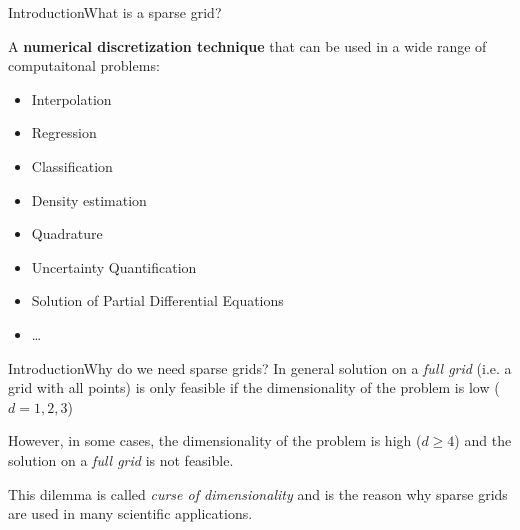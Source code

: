 \begin{frame}{Introduction}{What is a sparse grid?}

    A \textbf{numerical discretization technique} that can be used in a wide range of computaitonal problems:
    \begin{itemize}[<+->]
        \item Interpolation
        \item Regression
        \item Classification
        \item Density estimation
        \item Quadrature
        \item Uncertainty Quantification
        \item Solution of Partial Differential Equations
        \item \ldots
    \end{itemize}

\end{frame}

\begin{frame}{Introduction}{Why do we need sparse grids?}
    In general solution on a \emph{full grid} (i.e. a grid with all points) is only feasible if the dimensionality of the problem is low ($d=1,2,3$)

    \pause

    However, in some cases, the dimensionality of the problem is high ($d\ge 4$) and the solution on a \emph{full grid} is not feasible.

    \pause

    This dilemma is called \emph{curse of dimensionality} and is the reason why sparse grids are used in many scientific applications.

\end{frame}

